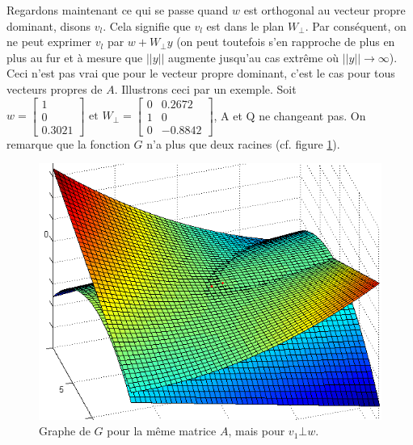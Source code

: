 Regardons maintenant ce qui se passe quand $w$ est orthogonal au vecteur propre dominant, disons $v_l$. Cela signifie que $v_l$ est dans le plan $W_{\bot}$. Par conséquent, on ne peut exprimer $v_l$ par $w+W_{\bot}y$ (on peut toutefois s'en rapproche de plus en plus au fur et à mesure que $||y||$ augmente jusqu'au cas extrême où $||y|| \rightarrow \infty$).\\
Ceci n'est pas vrai que pour le vecteur propre dominant, c'est le cas pour tous vecteurs propres de $A$. Illustrons ceci par un exemple.
Soit $w = 
\begin{bmatrix}
1 \\
0\\
0.3021
\end{bmatrix} \text{ et } 
W_{\bot} =  
\begin{bmatrix}
0 & 0.2672 \\
1 & 0 \\
0 & -0.8842 
\end{bmatrix}$, A et Q ne changeant pas. On remarque que la fonction $G$ n'a plus que deux racines (cf. figure \ref{FigNewtonv1inW}).

\begin{figure}
\centering
\includegraphics[width=12cm]{grapheG3.png}
\caption{Graphe de $G$ pour la même matrice $A$, mais pour $v_1 \bot w$.}
\label{FigNewtonv1inW}
\end{figure}


